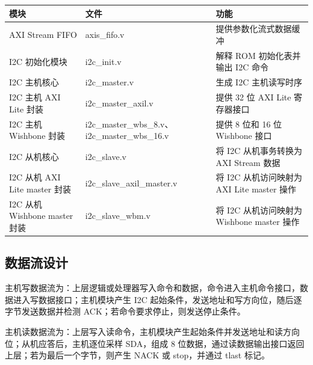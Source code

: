 \documentclass[12pt,a4paper]{article}
\numberwithin{equation}{section}
\begin{document}
\begin{longtable}[]{@{}
  >{\raggedright\arraybackslash}p{}
  >{\raggedright\arraybackslash}p{}
  >{\raggedright\arraybackslash}p{}@{}}
\toprule\noalign{}
\begin{minipage}[b]{\linewidth}\raggedright
模块
\end{minipage} & \begin{minipage}[b]{\linewidth}\raggedright
文件
\end{minipage} & \begin{minipage}[b]{\linewidth}\raggedright
功能
\end{minipage} \\
\midrule\noalign{}
\endhead
\bottomrule\noalign{}
\endlastfoot
AXI Stream FIFO & axis\_fifo.v &
提供参数化流式数据缓冲 \\
I2C 初始化模块 & i2c\_init.v & 解释 ROM
初始化表并输出 I2C 命令 \\
I2C 主机核心 & i2c\_master.v & 生成 I2C
主机读写时序 \\
I2C 主机 AXI Lite 封装 & i2c\_master\_axil.v &
提供 32 位 AXI Lite 寄存器接口 \\
I2C 主机 Wishbone 封装 &
i2c\_master\_wbs\_8.v、i2c\_master\_wbs\_16.v
& 提供 8 位和 16 位 Wishbone 接口 \\
I2C 从机核心 & i2c\_slave.v & 将 I2C
从机事务转换为 AXI Stream 数据 \\
I2C 从机 AXI Lite master 封装 &
i2c\_slave\_axil\_master.v & 将 I2C
从机访问映射为 AXI Lite master 操作 \\
I2C 从机 Wishbone master 封装 &
i2c\_slave\_wbm.v & 将 I2C 从机访问映射为
Wishbone master 操作 \\
\end{longtable}

\subsection{数据流设计}\label{ux6570ux636eux6d41ux8bbeux8ba1}

主机写数据流为：上层逻辑或处理器写入命令和数据，命令进入主机命令接口，数据进入写数据接口；主机模块产生
I2C 起始条件，发送地址和写方向位，随后逐字节发送数据并检测
ACK；若命令要求停止，则发送停止条件。

主机读数据流为：上层写入读命令，主机模块产生起始条件并发送地址和读方向位；从机应答后，主机逐位采样
SDA，组成 8 位数据，通过读数据输出接口返回上层；若为最后一个字节，则产生
NACK 或 stop，并通过 tlast 标记。
\end{document}
